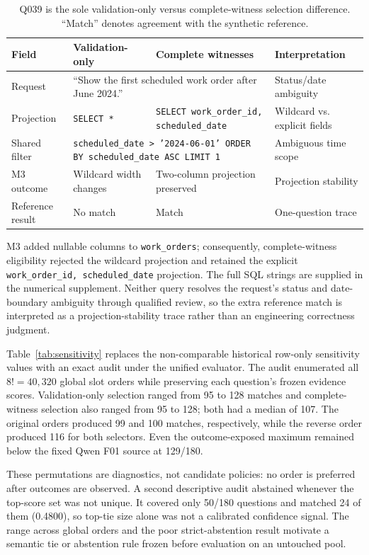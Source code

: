 \documentclass[applsci,article,submit,moreauthors]{Definitions/mdpi}
\begin{document}
\begin{table}[htbp]
\caption{Q039 is the sole validation-only versus complete-witness selection difference. ``Match'' denotes agreement with the synthetic reference.}
\label{tab:q039}
\centering
\footnotesize
\setlength{\tabcolsep}{3pt}
\begin{tabular}{p{2.2cm}p{4.0cm}p{4.0cm}p{1.8cm}}
\toprule
Field & Validation-only & Complete witnesses & Interpretation\\
\midrule
Request & \multicolumn{2}{p{8.8cm}}{``Show the first scheduled work order after June 2024.''} & Status/date ambiguity\\
Projection & \texttt{SELECT *} & \texttt{SELECT work\_order\_id, scheduled\_date} & Wildcard vs. explicit fields\\
Shared filter & \multicolumn{2}{p{8.8cm}}{\texttt{scheduled\_date > '2024-06-01' ORDER BY scheduled\_date ASC LIMIT 1}} & Ambiguous time scope\\
M3 outcome & Wildcard width changes & Two-column projection preserved & Projection stability\\
Reference result & No match & Match & One-question trace\\
\bottomrule
\end{tabular}
\end{table}

M3 added nullable columns to \texttt{work\_orders}; consequently, complete-witness eligibility rejected the wildcard projection and retained the explicit \texttt{work\_order\_id, scheduled\_date} projection. The full SQL strings are supplied in the numerical supplement. Neither query resolves the request's status and date-boundary ambiguity through qualified review, so the extra reference match is interpreted as a projection-stability trace rather than an engineering correctness judgment.

Table~\ref{tab:sensitivity} replaces the non-comparable historical row-only sensitivity values with an exact audit under the unified evaluator. The audit enumerated all $8!=40{,}320$ global slot orders while preserving each question's frozen evidence scores. Validation-only selection ranged from 95 to 128 matches and complete-witness selection also ranged from 95 to 128; both had a median of 107. The original orders produced 99 and 100 matches, respectively, while the reverse order produced 116 for both selectors. Even the outcome-exposed maximum remained below the fixed Qwen F01 source at 129/180.

These permutations are diagnostics, not candidate policies: no order is preferred after outcomes are observed. A second descriptive audit abstained whenever the top-score set was not unique. It covered only 50/180 questions and matched 24 of them (0.4800), so top-tie size alone was not a calibrated confidence signal. The range across global orders and the poor strict-abstention result motivate a semantic tie or abstention rule frozen before evaluation on an untouched pool.
\end{document}
